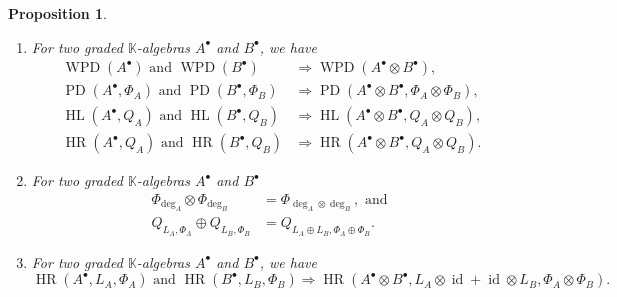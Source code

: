\documentclass[11pt]{amsart}
\newtheorem{prop}[thm]{Proposition}
\theoremstyle{definition}
\numberwithin{equation}{section}
\renewcommand{\~}{\widetilde}
\newcommand{\myand}{\text{ and }}
\newcommand{\bul}{\bullet} %
\DeclareMathOperator{\HR}{HR} %
\DeclareMathOperator{\HL}{HL} %
\DeclareMathOperator{\WPD}{WPD} %
\DeclareMathOperator{\PD}{PD} %
\DeclareMathOperator{\id}{id} %
\newcommand{\corps}{\mathbb K} %
\begin{document}
\begin{prop}
\begin{enumerate}[label=\textnormal{(\theequation)}, ref={\theequation}, labelindent={0pt}, leftmargin=*]
\item \label{prop:HR:otimes}
  For two graded $\corps$-algebras $A^\bul$ and $B^\bul$, we have
  \begin{align*}
  \WPD(A^\bul)\myand\WPD(B^\bul)             &\Longrightarrow \WPD(A^\bul\otimes B^\bul), \\
  \PD(A^\bul,\Phi_A)\myand\PD(B^\bul,\Phi_B) &\Longrightarrow \PD(A^\bul\otimes B^\bul,\Phi_A\otimes \Phi_B), \\
  \HL(A^\bul,Q_A)\myand\HL(B^\bul,Q_B)       &\Longrightarrow \HL(A^\bul\otimes B^\bul,Q_A\otimes Q_B), \\
  \HR(A^\bul,Q_A)\myand\HR(B^\bul,Q_B)       &\Longrightarrow \HR(A^\bul\otimes B^\bul,Q_A\otimes Q_B).
  \end{align*}

\item \label{prop:HR:poincare_plus}
  For two graded $\corps$-algebras $A^\bul$ and $B^\bul$
  \begin{align*}
  \Phi_{\deg_A}\otimes\Phi_{\deg_B}   &= \Phi_{\deg_A\otimes\deg_B}, \text{ and } \\
  Q_{L_A,\Phi_A}\oplus Q_{L_B,\Phi_B} &= Q_{L_A\oplus L_B,\Phi_A\oplus\Phi_B}.
  \end{align*}

\item \label{prop:HR:otimes_lefschetz}
  For two graded $\corps$-algebras $A^\bul$ and $B^\bul$, we have
  \[ \HR(A^\bul,L_A,\Phi_{A})\myand\HR(B^\bul,L_B,\Phi_B)\Longrightarrow\HR(A^\bul\otimes B^\bul, L_A\otimes\id+\id\otimes L_B,\Phi_A\otimes \Phi_B). \]
\end{enumerate}
\end{prop}
\end{document}

